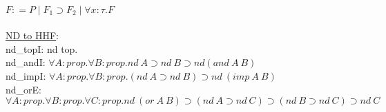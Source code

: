 \\ $F : = P \mid F_1 \supset F_2 \mid \forall x : \tau . F$
\\
\\ \underline{ND to HHF}:
\\nd\_topI: nd top.
\\nd\_andI: $\forall A : prop.\forall B:prop.nd\ A
\supset nd\ B \supset nd (and\ A\ B)$
\\ nd\_impI: $\forall A : prop.\forall B :prop.(nd\ A \supset nd\ B)
\supset nd\ (imp\ A\ B)$
\\ nd\_orE: $\forall A: prop.\forall B:prop.\forall C:prop.nd\ (or\ A\
B) \supset (nd\ A \supset nd\ C) \supset (nd\ B \supset nd\ C) \supset
nd\ C$
\color{MidnightBlue}
